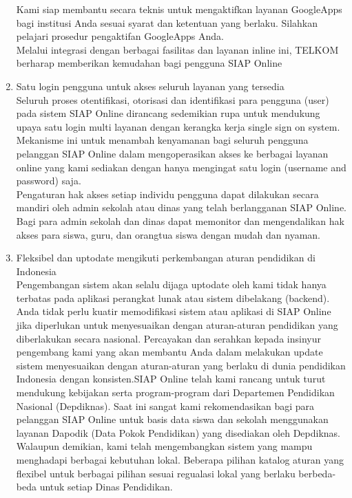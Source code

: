 \begin{enumerate}
Kami siap membantu secara teknis untuk mengaktifkan layanan GoogleApps bagi institusi Anda sesuai syarat dan ketentuan yang berlaku. Silahkan pelajari prosedur pengaktifan GoogleApps Anda.\\
Melalui integrasi dengan berbagai fasilitas dan layanan inline ini, TELKOM berharap memberikan kemudahan bagi  pengguna SIAP Online
\item Satu login pengguna untuk akses seluruh layanan yang tersedia\\
Seluruh proses otentifikasi, otorisasi dan identifikasi para pengguna (user) pada sistem SIAP Online dirancang sedemikian rupa untuk mendukung upaya satu login multi layanan dengan kerangka kerja single sign on system. Mekanisme ini untuk menambah kenyamanan bagi seluruh pengguna pelanggan SIAP Online dalam mengoperasikan akses ke berbagai layanan online yang kami sediakan dengan hanya mengingat satu login (username and password) saja.\\
Pengaturan hak akses setiap individu pengguna dapat dilakukan secara mandiri oleh admin sekolah atau dinas yang telah berlangganan SIAP Online. Bagi para admin sekolah dan dinas dapat memonitor dan mengendalikan hak akses  para siswa,  guru, dan orangtua siswa dengan mudah dan nyaman.
\item Fleksibel  dan uptodate mengikuti perkembangan aturan pendidikan di Indonesia\\
Pengembangan sistem akan selalu dijaga uptodate oleh kami tidak hanya terbatas pada aplikasi perangkat lunak atau sistem dibelakang (backend). Anda tidak perlu kuatir memodifikasi sistem atau aplikasi di SIAP Online jika diperlukan untuk menyesuaikan dengan aturan-aturan pendidikan yang diberlakukan secara nasional. Percayakan dan serahkan kepada insinyur pengembang kami yang akan membantu Anda dalam melakukan update sistem menyesuaikan dengan aturan-aturan yang berlaku di dunia pendidikan Indonesia dengan konsisten.SIAP Online telah kami rancang untuk turut mendukung kebijakan serta program-program dari Departemen Pendidikan Nasional (Depdiknas). Saat ini sangat kami rekomendasikan bagi para pelanggan SIAP Online untuk basis data siswa dan sekolah menggunakan layanan Dapodik (Data Pokok Pendidikan) yang disediakan oleh Depdiknas.\\
Walaupun demikian, kami telah mengembangkan sistem yang mampu menghadapi berbagai kebutuhan lokal. Beberapa pilihan katalog aturan yang flexibel untuk berbagai pilihan sesuai regualasi lokal  yang berlaku berbeda-beda untuk setiap Dinas Pendidikan.
\end{enumerate}
